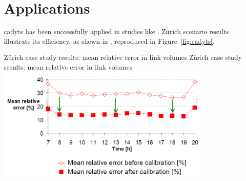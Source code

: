 \section{Applications}
\gls{cadyts} has been successfully applied in studies like %
\citet[][]{ZiemkeNagelBhatIntegratingCemdapMatsimTransferability,ZilskeNagelPhoneTracesAndCadyts, FloetteroedChenEtAl2011BehavioralCalibAndAnaNETS}. 
Zürich scenario results illustrate its efficiency, as shown in \citet[][Slide~8]{FloetteroedEtAl_unpub_MATSimUserMeeting_2011}, 
reproduced in Figure~\ref{fig:cadyts}.

\createfigure%
{Zürich case study results: mean relative error in link volumes}%
{Zürich case study results: mean relative error in link volumes}%
{\label{fig:cadyts}}%
{\includegraphics[width=0.8\textwidth, angle=0]{extending/figures/cadyts/cadyts}}%
{\citet[][Slide~8]{FloetteroedEtAl_unpub_MATSimUserMeeting_2011}}


